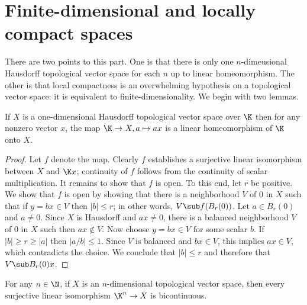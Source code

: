 \section{Finite-dimensional and locally compact spaces}
There are two points to this part. One is that there is only one $n$-dimeusional Hausdorff topological vector space for each $n$ up to linear homeomorphism. The other is that local compactness is an overwhelming hypothesis on a topological vector space: it is equivalent to finite-dimensionality. We begin with two lemmas.
\begin{lemma}\label{TVS dim 1 homeomorphic to K}
If $X$ is a one-dimensional Hausdorff topological vector space over $\K$ then for any nonzero vector $x$, the map $\K\to X,a\mapsto ax$ is a linear homeomorphism of $\K$ onto $X$.
\end{lemma}
\begin{proof}
Let $f$ denote the map. Clearly $f$ establishes a surjective linear isomorphism between $X$ and $\K x$; continuity of $f$ follows from the continuity of scalar multiplication. It remains to show that $f$ is open. To this end, let $r$ be positive. We show that $f$ is open by showing that there is a neighborhood $V$ of $0$ in $X$ such that if $y=bx\in V$ then $|b|\leq r$; in other words, $V\sub f(B_r(0))$. Let $a\in B_r(0)$ and $a\neq 0$. Since $X$ is Hausdorff and $ax\neq 0$, there is a balanced neighborhood $V$ of $0$ in $X$ such then $ax\notin V$. Now choose $y=bx\in V$ for some scalar $b$. If $|b|\geq r\geq|a|$ then $|a/b|\leq 1$. Since $V$ is balanced and $bx\in V$, this implies $ax\in V$, which contradicts the choice. We conclude that $|b|\leq r$ and therefore that $V\sub B_r(0)x$. 
\end{proof}
\begin{lemma}\label{TVS finite dim homeomorphic to K^n}
For any $n\in\N$, if $X$ is an $n$-dimensional topological vector space, then every surjective linear isomorphism $\K^n\to X$ is bicontinuous.
\end{lemma}
